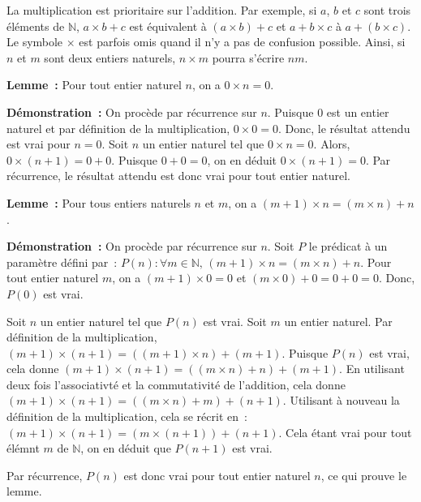     La multiplication est prioritaire sur l'addition. 
    Par exemple, si $a$, $b$ et $c$ sont trois éléments de $\mathbb{N}$, $a \times b + c$ est équivalent à $(a \times b) + c$ et $a + b \times c$ à $a + (b \times c)$.
    Le symbole $\times$ est parfois omis quand il n'y a pas de confusion possible. 
    Ainsi, si $n$ et $m$ sont deux entiers naturels, $n \times m$ pourra s'écrire $n m$.
     \sindex[isy]{$\times$}

\medskip

\noindent\textbf{Lemme :} Pour tout entier naturel $n$, on a $0 \times n = 0$.

\medskip

\noindent\textbf{Démonstration :} On procède par récurrence sur $n$. 
    Puisque $0$ est un entier naturel et par définition de la multiplication, $0 \times 0 = 0$. 
    Donc, le résultat attendu est vrai pour $n = 0$. 
    Soit $n$ un entier naturel tel que $0 \times n = 0$. 
    Alors, $0 \times (n+1) = 0 + 0$.
    Puisque $0 + 0 = 0$, on en déduit $0 \times (n+1) = 0$. 
    Par récurrence, le résultat attendu est donc vrai pour tout entier naturel. 

   \done 

\medskip

\noindent\textbf{Lemme :} Pour tous entiers naturels $n$ et $m$, on a $(m+1) \times n = (m \times n) + n$.

\medskip

\noindent\textbf{Démonstration :} On procède par récurrence sur $n$. 
    Soit $P$ le prédicat à un paramètre défini par : $P(n): \forall m \in \mathbb{N}, \, (m+1) \times n = (m \times n) + n$. 
    Pour tout entier naturel $m$, on a $(m+1) \times 0 = 0$ et $(m \times 0) + 0 = 0 + 0 = 0$. 
    Donc, $P(0)$ est vrai. 

    Soit $n$ un entier naturel tel que $P(n)$ est vrai. 
    Soit $m$ un entier naturel. 
    Par définition de la multiplication, $(m+1) \times (n+1) = ((m+1) \times n) + (m+1)$. 
    Puisque $P(n)$ est vrai, cela donne $(m+1) \times (n+1) = ((m \times n) + n) + (m+1)$. 
    En utilisant deux fois l'associativté et la commutativité de l'addition, cela donne $(m+1) \times (n+1) = ((m \times n) + m) + (n+1)$. 
    Utilisant à nouveau la définition de la multiplication, cela se récrit en : $(m+1) \times (n+1) = (m \times (n+1)) + (n+1)$. 
    Cela étant vrai pour tout élémnt $m$ de $\mathbb{N}$, on en déduit que $P(n+1)$ est vrai. 

    Par récurrence, $P(n)$ est donc vrai pour tout entier naturel $n$, ce qui prouve le lemme.

